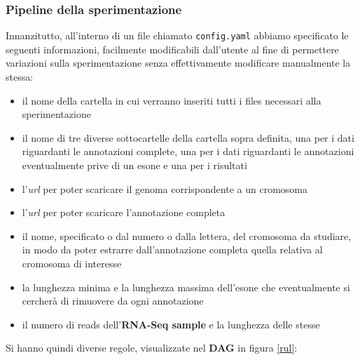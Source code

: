 \documentclass[a4paper,12pt, oneside]{book}
\begin{document}
\subsubsection{Pipeline della sperimentazione}
Innanzitutto, all'interno di un file chiamato \texttt{config.yaml} abbiamo
specificato le seguenti informazioni, facilmente modificabili dall'utente al
fine di permettere variazioni sulla sperimentazione senza effettivamente
modificare manualmente la stessa:
\begin{itemize}
  \item il nome della cartella in cui verranno inseriti tutti i files necessari
  alla sperimentazione
  \item il nome di tre diverse sottocartelle della cartella sopra definita, una
  per i dati riguardanti le annotazioni complete, una per  i dati riguardanti le
  annotazioni eventualmente prive di un esone e una per i risultati
  \item l'\textit{url} per poter scaricare il genoma corrispondente a un
  cromosoma 
  \item l'\textit{url} per poter scaricare l'annotazione completa
  \item il nome, specificato o dal numero o dalla lettera, del cromosoma da
  studiare, in modo da poter estrarre dall'annotazione completa quella relativa
  al cromosoma di interesse
  \item la lunghezza minima e la lunghezza massima dell'esone che eventualmente
  si cercherà di rimuovere da ogni annotazione
  \item il numero di reads dell'\textbf{RNA-Seq sample} e la lunghezza delle
  stesse  
\end{itemize}
Si hanno quindi diverse regole, visualizzate nel \textbf{DAG} in figura
\ref{rul}: 
\end{document}
